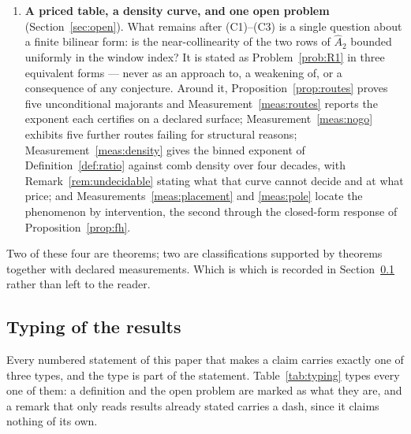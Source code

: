 \documentclass[11pt,a4paper]{article}
\theoremstyle{plain}
\theoremstyle{definition}
\newcommand{\Ah}{\widehat{A}}
\begin{document}
\begin{enumerate}[label=(C\arabic*),leftmargin=3.1em]
  functionals of the comb weights, for every window, every $h$ and every
  truncation. Corollary~\ref{cor:majorant} turns this into the statement about
  majorants that the priced routes of Section~\ref{sec:open} run into.
\item\label{C:nogo} \textbf{A priced table, a density curve, and one open
  problem} (Section~\ref{sec:open}). What remains after (C1)--(C3) is a single
  question about a finite bilinear form: is the near-collinearity of the two
  rows of $\Ah_2$ bounded uniformly in the window index? It is stated as
  Problem~\ref{prob:R1} in three equivalent forms --- never as an approach to, a
  weakening of, or a consequence of any conjecture. Around it,
  Proposition~\ref{prop:routes} proves five unconditional majorants and
  Measurement~\ref{meas:routes} reports the exponent each certifies on a
  declared surface; Measurement~\ref{meas:nogo} exhibits five further routes
  failing for structural reasons; Measurement~\ref{meas:density} gives the
  binned exponent of Definition~\ref{def:ratio} against comb density over four
  decades, with
  Remark~\ref{rem:undecidable} stating what that curve cannot decide and at what
  price; and Measurements~\ref{meas:placement} and \ref{meas:pole} locate the
  phenomenon by intervention, the second through the closed-form response of
  Proposition~\ref{prop:fh}.
\end{enumerate}

Two of these four are theorems; two are classifications supported by theorems
together with declared measurements. Which is which is recorded in
Section~\ref{sec:typing} rather than left to the reader.

\subsection{Typing of the results}
\label{sec:typing}

Every numbered statement of this paper that makes a claim carries exactly one of
three types, and the type is part of the statement. Table~\ref{tab:typing} types
every one of them: a definition and the open problem are marked as what they
are, and a remark that only reads results already stated carries a dash, since
it claims nothing of its own.
\end{document}
